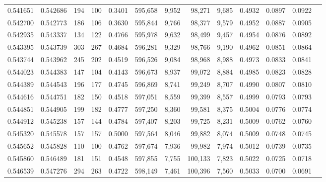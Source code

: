 \begin{tabular}{rrrrrrrrrrrrr}
0.541651 & 0.542686 &   194 &   100 &                                     0.3401 & 595,658 &   9,952 &  98,271 &   9,685 & 0.4932 & 0.0897 & 0.0922 \\
0.542700 & 0.542773 &   186 &   106 &                                     0.3630 & 595,844 &   9,766 &  98,377 &   9,579 & 0.4952 & 0.0887 & 0.0905 \\
0.542935 & 0.543337 &   134 &   122 &                                     0.4766 & 595,978 &   9,632 &  98,499 &   9,457 & 0.4954 & 0.0876 & 0.0892 \\
0.543395 & 0.543739 &   303 &   267 &                                     0.4684 & 596,281 &   9,329 &  98,766 &   9,190 & 0.4962 & 0.0851 & 0.0864 \\
0.543744 & 0.543962 &   245 &   202 &                                     0.4519 & 596,526 &   9,084 &  98,968 &   8,988 & 0.4973 & 0.0833 & 0.0841 \\
0.544023 & 0.544383 &   147 &   104 &                                     0.4143 & 596,673 &   8,937 &  99,072 &   8,884 & 0.4985 & 0.0823 & 0.0828 \\
0.544389 & 0.544543 &   196 &   177 &                                     0.4745 & 596,869 &   8,741 &  99,249 &   8,707 & 0.4990 & 0.0807 & 0.0810 \\
0.544616 & 0.544751 &   182 &   150 &                                     0.4518 & 597,051 &   8,559 &  99,399 &   8,557 & 0.4999 & 0.0793 & 0.0793 \\
0.544851 & 0.544905 &   199 &   182 &                                     0.4777 & 597,250 &   8,360 &  99,581 &   8,375 & 0.5004 & 0.0776 & 0.0774 \\
0.544912 & 0.545238 &   157 &   144 &                                     0.4784 & 597,407 &   8,203 &  99,725 &   8,231 & 0.5009 & 0.0762 & 0.0760 \\
0.545320 & 0.545578 &   157 &   157 &                                     0.5000 & 597,564 &   8,046 &  99,882 &   8,074 & 0.5009 & 0.0748 & 0.0745 \\
0.545652 & 0.545828 &   110 &   100 &                                     0.4762 & 597,674 &   7,936 &  99,982 &   7,974 & 0.5012 & 0.0739 & 0.0735 \\
0.545860 & 0.546489 &   181 &   151 &                                     0.4548 & 597,855 &   7,755 & 100,133 &   7,823 & 0.5022 & 0.0725 & 0.0718 \\
0.546539 & 0.547276 &   294 &   263 &                                     0.4722 & 598,149 &   7,461 & 100,396 &   7,560 & 0.5033 & 0.0700 & 0.0691 \\

\end{tabular}
